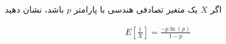\problem{}
اگر 
$X$
یک متغیر تصادفی هندسی با پارامتر
$p$
باشد، نشان دهید

\begin{gather*}
	E[\frac{1}{X}] = \frac{-p\ln (p)}{1 - p}
\end{gather*}
